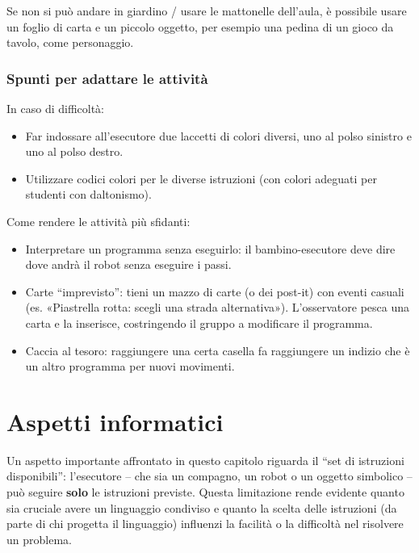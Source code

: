 Se non si può andare in giardino / usare le mattonelle dell'aula, è possibile usare un foglio di carta e un piccolo oggetto, per esempio una pedina di un gioco da tavolo, come personaggio.

\newpage
\subsubsection{Spunti per adattare le attività}


In caso di difficoltà:

\begin{itemize}
\item
  Far indossare all'esecutore due laccetti di colori diversi, uno al polso sinistro e uno al polso destro.
\item
  Utilizzare codici colori per le diverse istruzioni (con colori adeguati per studenti con daltonismo).
\end{itemize}

\noindent Come rendere le attività più sfidanti:

\begin{itemize}
\item
  Interpretare un programma senza eseguirlo: il bambino-esecutore deve dire dove andrà il robot senza eseguire i passi.
\item
  Carte ``imprevisto'': tieni un mazzo di carte (o dei post-it) con eventi casuali (es. «Piastrella rotta: scegli una strada alternativa»). L'osservatore pesca una carta e la inserisce, costringendo il gruppo a modificare il programma.
\item
  Caccia al tesoro: raggiungere una certa casella fa raggiungere un indizio che è un altro programma per nuovi movimenti.
\end{itemize}

\section{Aspetti informatici }\label{aspetti-informatici-1}

Un aspetto importante affrontato in questo capitolo riguarda il ``set di istruzioni disponibili'': l'esecutore -- che sia un compagno, un robot o un oggetto simbolico -- può seguire \textbf{solo} le istruzioni previste. Questa limitazione rende evidente quanto sia cruciale avere un linguaggio condiviso e quanto la scelta delle istruzioni (da parte di chi progetta il linguaggio) influenzi la facilità o la difficoltà nel risolvere un problema.

